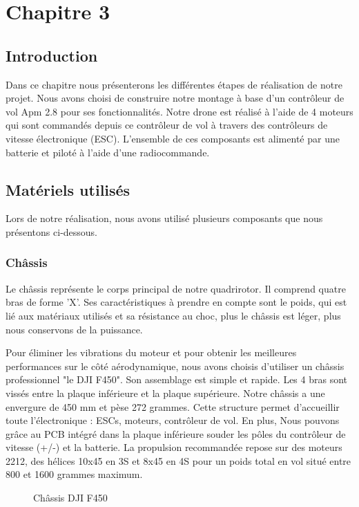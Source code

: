 

	

\chapter{Chapitre 3}
\newpage
	\section{Introduction}
	
	Dans ce chapitre nous présenterons les différentes étapes de réalisation de notre projet. Nous avons choisi de construire notre montage à base d’un contrôleur de vol Apm 2.8 pour ses fonctionnalités. Notre drone est réalisé à l’aide de 4 moteurs qui sont commandés depuis ce contrôleur de vol  à travers des contrôleurs de vitesse électronique (ESC). L'ensemble de ces composants  est alimenté par une batterie et piloté à l’aide d’une radiocommande.
	\section{Matériels utilisés}
	Lors de notre réalisation, nous avons utilisé plusieurs composants que nous présentons ci-dessous.
	\subsection{Châssis}
	Le châssis représente le corps principal de notre quadrirotor. Il comprend quatre bras de forme ’X’. Ses caractéristiques à prendre en compte sont le poids, qui est lié aux matériaux utilisés et sa résistance au choc, plus le châssis est léger, plus nous conservons de la puissance.
	
	Pour éliminer les vibrations du moteur et pour obtenir les meilleures performances sur le côté aérodynamique, nous avons choisis d’utiliser un châssis professionnel "le DJI F450". Son assemblage est simple et rapide. Les 4 bras sont vissés entre la plaque inférieure et la plaque supérieure. Notre châssis a une envergure de 450 mm et pèse 272 grammes.
	Cette structure permet d’accueillir toute l’électronique : ESCs, moteurs, contrôleur de vol. En plus, Nous pouvons grâce au PCB intégré dans la plaque inférieure souder les pôles  du contrôleur de vitesse (+/-) et la batterie. La propulsion recommandée repose sur des moteurs 2212, des hélices 10x45 en 3S et 8x45 en 4S pour un poids total en vol situé entre 800 et 1600 grammes maximum.
	
	\begin{figure} [h]
		\begin{center}
			\centering
		\end{center}
		\caption{Châssis DJI F450}
	\end{figure}
	\newpage
